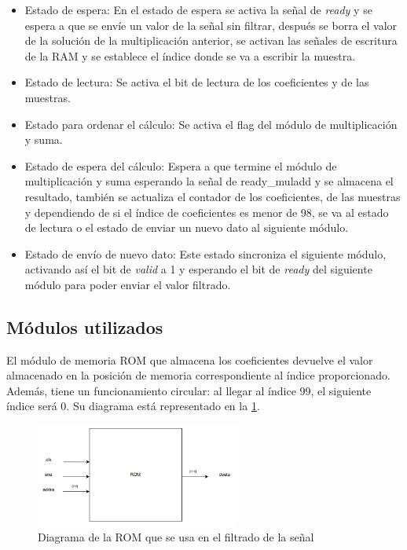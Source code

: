 \begin{itemize}
    \item Estado de espera: En el estado de espera se activa la señal de \textit{ready} y se espera a que se envíe un valor de la señal sin filtrar, después se borra el valor de la solución de la multiplicación anterior, se activan las señales de escritura de la RAM y se establece el índice donde se va a escribir la muestra.
    \item Estado de lectura: Se activa el bit de lectura de los coeficientes y de las muestras.
    \item Estado para ordenar el cálculo: Se activa el flag del módulo de multiplicación y suma.
    \item Estado de espera del cálculo: Espera a que termine el módulo de multiplicación y suma esperando la señal de ready\_muladd
    y se almacena el resultado, también se actualiza el contador de los coeficientes, de las muestras y dependiendo de si el 
    índice de coeficientes es menor de 98, se va al estado de lectura o el estado de enviar un nuevo dato al siguiente módulo.
    \item Estado de envío de nuevo dato: Este estado sincroniza el siguiente módulo, activando así el bit de \textit{valid} a 1 y esperando el bit
    de \textit{ready} del siguiente módulo para poder enviar el valor filtrado.
\end{itemize}

\subsection{Módulos utilizados}
El módulo de memoria ROM que almacena los coeficientes devuelve el valor almacenado en la posición de memoria correspondiente al índice proporcionado. Además, tiene un funcionamiento circular: al llegar al índice 99, el siguiente índice será 0. Su diagrama está representado en la \cref{fig:diagramamoduloROM}.

\begin{figure}[h!]
    \centering
    \includegraphics[width=0.6\textwidth]{./Images/img_implementacion_hw/diagramamoduloROM.png}
    \caption{Diagrama de la ROM que se usa en el filtrado de la señal}
    \label{fig:diagramamoduloROM}
\end{figure} 
\FloatBarrier

